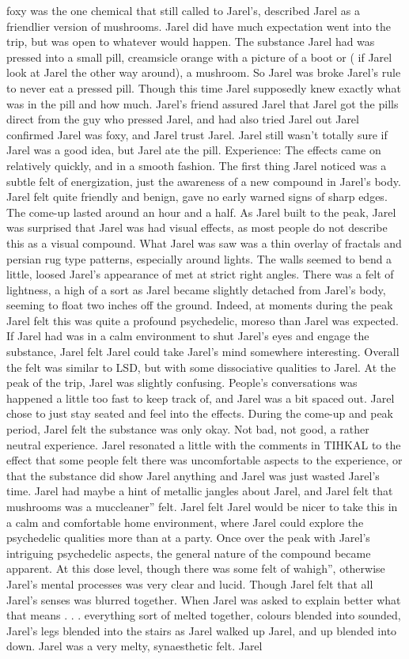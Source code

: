 \documentclass[12pt]{book}
\begin{document}
foxy was the one chemical that still called to Jarel's, described Jarel as a friendlier version of mushrooms. Jarel did have much expectation went into the trip, but was open to whatever would happen. The substance Jarel had was pressed into a small pill, creamsicle orange with a picture of a boot or ( if Jarel look at Jarel the other way around), a mushroom. So Jarel was broke Jarel's rule to never eat a pressed pill. Though this time Jarel supposedly knew exactly what was in the pill and how much. Jarel's friend assured Jarel that Jarel got the pills direct from the guy who pressed Jarel, and had also tried Jarel out Jarel confirmed Jarel was foxy, and Jarel trust Jarel. Jarel still wasn't totally sure if Jarel was a good idea, but Jarel ate the pill. Experience: The effects came on relatively quickly, and in a smooth fashion. The first thing Jarel noticed was a subtle felt of energization, just the awareness of a new compound in Jarel's body. Jarel felt quite friendly and benign, gave no early warned signs of sharp edges. The come-up lasted around an hour and a half. As Jarel built to the peak, Jarel was surprised that Jarel was had visual effects, as most people do not describe this as a visual compound. What Jarel was saw was a thin overlay of fractals and persian rug type patterns, especially around lights. The walls seemed to bend a little, loosed Jarel's appearance of met at strict right angles. There was a felt of lightness, a high of a sort as Jarel became slightly detached from Jarel's body, seeming to float two inches off the ground. Indeed, at moments during the peak Jarel felt this was quite a profound psychedelic, moreso than Jarel was expected. If Jarel had was in a calm environment to shut Jarel's eyes and engage the substance, Jarel felt Jarel could take Jarel's mind somewhere interesting. Overall the felt was similar to LSD, but with some dissociative qualities to Jarel. At the peak of the trip, Jarel was slightly confusing. People's conversations was happened a little too fast to keep track of, and Jarel was a bit spaced out. Jarel chose to just stay seated and feel into the effects. During the come-up and peak period, Jarel felt the substance was only okay. Not bad, not good, a rather neutral experience. Jarel resonated a little with the comments in TIHKAL to the effect that some people felt there was uncomfortable aspects to the experience, or that the substance did show Jarel anything and Jarel was just wasted Jarel's time. Jarel had maybe a hint of metallic jangles about Jarel, and Jarel felt that mushrooms was a muccleaner'' felt. Jarel felt Jarel would be nicer to take this in a calm and comfortable home environment, where Jarel could explore the psychedelic qualities more than at a party. Once over the peak with Jarel's intriguing psychedelic aspects, the general nature of the compound became apparent. At this dose level, though there was some felt of wahigh'', otherwise Jarel's mental processes was very clear and lucid. Though Jarel felt that all Jarel's senses was blurred together. When Jarel was asked to explain better what that means . . .  everything sort of melted together, colours blended into sounded, Jarel's legs blended into the stairs as Jarel walked up Jarel, and up blended into down. Jarel was a very melty, synaesthetic felt. Jarel 
\end{document}
